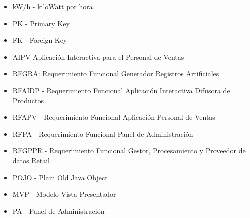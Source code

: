 \begin{itemize}
\item kW/h - kiloWatt por hora
\item PK - Primary Key
\item FK - Foreign Key
\item AIPV Aplicación Interactiva para el Personal de Ventas
\item RFGRA: Requerimiento Funcional Generador Registros Artificiales
\item RFAIDP - Requerimiento Funcional Aplicación Interactiva Difusora de Productos
\item RFAPV - Requerimiento Funcional Aplicación Personal de Ventas
\item RFPA - Requerimiento Funcional Panel de Administración
\item RFGPPR - Requerimiento Funcional Gestor, Procesamiento y Proveedor de datos Retail
\item POJO - Plain Old Java Object
\item MVP - Modelo Vista Presentador
\item PA - Panel de Administración
\end{itemize}

